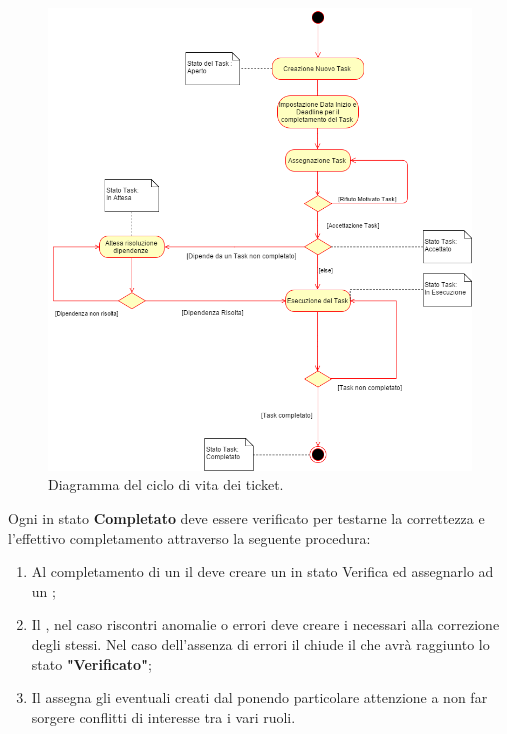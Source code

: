 \documentclass[12pt,a4paper]{article}
\begin{document}
\begin{center}
	\begin{figure}[H]
		\centering
		\label{f1-TicketCicloVita}
		\includegraphics[scale=0.6]{TicketCicloVita.png}
		\caption{Diagramma del ciclo di vita dei ticket.}
	\end{figure}
\end{center}


\label{ticketVerifica}
Ogni \textit{} in stato \textbf{Completato} deve essere verificato per testarne la correttezza e l'effettivo completamento attraverso la seguente procedura:

\begin{enumerate}
	\item Al completamento di un \textit{} il \PM{} deve creare un \textit{} in stato Verifica ed assegnarlo ad un \VR{};
	\item Il \VR{}, nel caso riscontri anomalie o errori deve creare i \textit{} necessari alla correzione degli stessi. Nel caso dell'assenza di errori il \VR{} chiude il \textit{} che avrà raggiunto lo stato \textbf{"Verificato"};
	\item Il \PM{} assegna gli eventuali \textit{} creati dal \VR{} ponendo particolare attenzione a non far sorgere conflitti di interesse tra i vari ruoli.
\end{enumerate}
 
\end{document}

